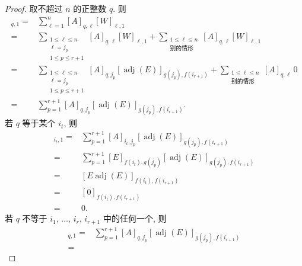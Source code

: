 \documentclass[../libro.tex]{subfiles}
\begin{document}
\begin{proof}
    取不超过 \(n\) 的正整数 \(q\).
    则
    \begin{align*}
        [AW]_{q,1}
        = {} &
        \sum_{\ell = 1}^{n}
        {[A]_{q,\ell} [W]_{\ell,1}}
        \\
        = {} &
        \sum_{\substack{
                1 \leq \ell \leq n \\
                \ell = j_p         \\
                1 \leq p \leq r+1
        }}
        {[A]_{q,\ell} [W]_{\ell,1}}
        +
        \sum_{\substack{
                1 \leq \ell \leq n \\
                \text{别的情形}
        }}
        {[A]_{q,\ell} [W]_{\ell,1}}
        \\
        = {} &
        \sum_{\substack{
                1 \leq \ell \leq n \\
                \ell = j_p         \\
                1 \leq p \leq r+1
        }}
        {[A]_{q,j_p}
        [\operatorname{adj} {(E)}]_{g(j_p),f(i_{r+1})}}
        +
        \sum_{\substack{
                1 \leq \ell \leq n \\
                \text{别的情形}
        }}
        {[A]_{q,\ell}\, 0}
        \\
        = {} &
        \sum_{p=1}^{r+1}
        {[A]_{q,j_p}
        [\operatorname{adj} {(E)}]_{g(j_p),f(i_{r+1})}}.
    \end{align*}
    若 \(q\) 等于某个 \(i_t\), 则
    \begin{align*}
        [AW]_{i_t,1}
        = {} &
        \sum_{p=1}^{r+1}
        {[A]_{i_t,j_p}
        [\operatorname{adj} {(E)}]_{g(j_p),f(i_{r+1})}}
        \\
        = {} &
        \sum_{p=1}^{r+1}
        {[E]_{f(i_t),g(j_p)}
        [\operatorname{adj} {(E)}]_{g(j_p),f(i_{r+1})}}
        \\
        = {} &
        [E \operatorname{adj} {(E)}]_{f(i_t),f(i_{r+1})}
        \\
        = {} &
        [0]_{f(i_t),f(i_{r+1})}
        \\
        = {} & 0.
    \end{align*}
    若 \(q\) 不等于
    \(i_1\), \(\dots\), \(i_r\), \(i_{r+1}\)
    中的任何一个,
    则
    \begin{align*}
        [AW]_{q,1}
        = {} &
        \sum_{p=1}^{r+1}
        {[A]_{q,j_p}
        [\operatorname{adj} {(E)}]_{g(j_p),f(i_{r+1})}}
        \\
        = {} &

\end{align*}
\end{proof}
\end{document}

